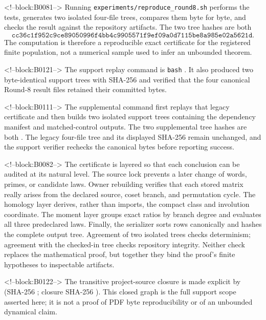 \documentclass[11pt]{article}
\theoremstyle{definition}
\theoremstyle{remark}
\begin{document}
<!--block:B0081-->
Running \texttt{experiments/reproduce\_round8.sh} performs the tests, generates two isolated four-file trees, compares them byte for byte, and checks the result against the repository artifacts. The two tree hashes are both
\[
\texttt{cc36c1f952c9ce89050996f4bb4c9905571f9ef09a0d7115be8a985e02a5621d}.
\]
The computation is therefore a reproducible exact certificate for the registered finite population, not a numerical sample used to infer an unbounded theorem.

<!--block:B0121-->
The support replay command is \texttt{bash} . It also produced two byte-identical support trees with SHA-256  and verified that the four canonical Round-8 result files retained their committed bytes.

<!--block:B0111-->
The supplemental command
first replays that legacy certificate and then builds two isolated support trees containing the dependency manifest and matched-control outputs. The two supplemental tree hashes are both
.
The legacy four-file tree and its displayed SHA-256 remain unchanged, and the support verifier rechecks the canonical bytes before reporting success.

<!--block:B0082-->
The certificate is layered so that each conclusion can be audited at its natural level. The source lock prevents a later change of words, primes, or candidate laws. Owner rebuilding verifies that each stored matrix really arises from the declared source, coset branch, and permutation cycle. The homology layer derives, rather than imports, the compact class and involution coordinate. The moment layer groups exact ratios by branch degree and evaluates all three predeclared laws. Finally, the serializer sorts rows canonically and hashes the complete output tree. Agreement of two isolated trees checks determinism; agreement with the checked-in tree checks repository integrity. Neither check replaces the mathematical proof, but together they bind the proof's finite hypotheses to inspectable artifacts.

<!--block:B0122-->
The transitive project-source closure is made explicit by  (SHA-256 ; closure SHA-256 ). This closed graph is the full support scope asserted here; it is not a proof of PDF byte reproducibility or of an unbounded dynamical claim.
\end{document}
